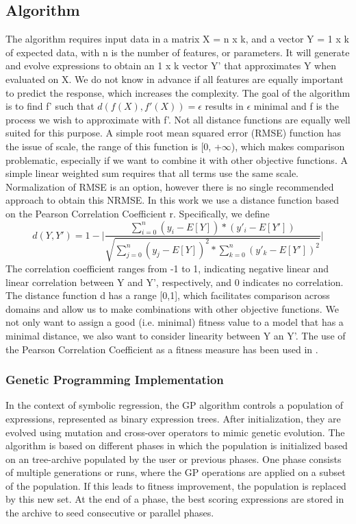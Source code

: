
\subsection{Algorithm}
The algorithm requires input data in a matrix X = n x k, and a vector Y = 1 x k of expected data, with n is the number of features, or parameters. It will generate and evolve expressions to obtain an 1 x k vector Y' that approximates Y when evaluated on X. We do not know in advance if all features are equally important to predict the response, which increases the complexity.
The goal of the algorithm is to find f' such that
$
d(f(X), f'(X))=\epsilon
$
results in $\epsilon$ minimal and f is the process we wish to approximate with f'.
Not all distance functions are equally well suited for this purpose. A simple root mean squared error (RMSE) function has the issue of scale, the range of this function is [0, +$\infty$), which makes comparison problematic, especially if we want to combine it with other objective functions. A simple linear weighted sum requires that all terms use the same scale.
Normalization of RMSE is an option, however there is no single recommended approach to obtain this NRMSE.
In this work we use a distance function based on the Pearson Correlation Coefficient r. Specifically, we define
\[
d(Y, Y') = 1 - 
\lvert \frac{\sum_{i=0}^{n}{(y_i-E[Y])*(y'_i-E[Y'])}}{\sqrt{\sum_{j=0}^{n}{(y_j-E[Y])^2}*\sum_{k=0}^{n}{(y'_k-E[Y'])^2}}}
 \lvert 
 \]
The correlation coefficient ranges from -1 to 1, indicating negative linear and linear correlation between Y and Y', respectively, and 0 indicates no correlation. The distance function d has a range [0,1], which facilitates comparison across domains and allow us to make combinations with other objective functions. We not only want to assign a good (i.e. minimal) fitness value to a model that has a minimal distance, we also want to consider linearity between Y an Y'. The use of the Pearson Correlation Coefficient as a fitness measure has been used in \citep{pearson}.

\subsubsection{Genetic Programming Implementation}
In the context of symbolic regression, the GP algorithm controls a population of expressions, represented as binary expression trees. After initialization, they are evolved using mutation and cross-over operators to mimic genetic evolution.
The algorithm is based on different phases in which the population is initialized based on an tree-archive populated by the user or previous phases. One phase consists of multiple generations or runs, where the GP operations are applied on a subset of the population. If this leads to fitness improvement, the population is replaced by this new set. At the end of a phase, the best scoring expressions are stored in the archive to seed consecutive or parallel phases.

